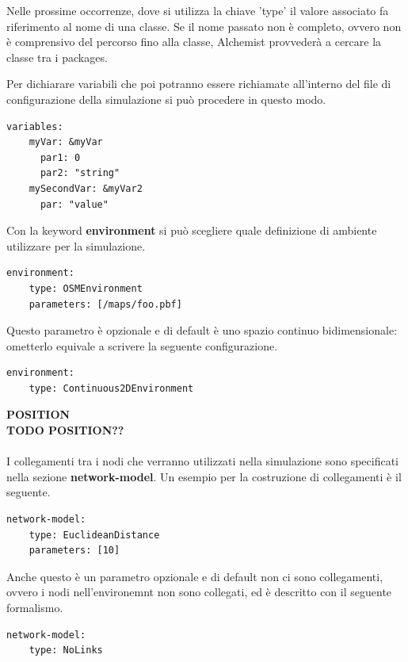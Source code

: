 \documentclass[12pt,a4paper,openright,twoside]{report}
\begin{document}
Nelle prossime occorrenze, dove si utilizza la chiave 'type' il valore associato fa riferimento al nome di una classe. Se il nome passato non \`e completo, ovvero non \`e comprensivo del percorso fino alla classe, Alchemist provveder\`a a cercare la classe tra i packages.

Per dichiarare variabili che poi potranno essere richiamate all'interno del file di configurazione della simulazione si pu\`o procedere in questo modo.
\medskip
\begin{lstlisting}[firstnumber=last,caption={Variabili simulazione}]
  variables:
    myVar: &myVar
      par1: 0
      par2: "string"
    mySecondVar: &myVar2
      par: "value"
\end{lstlisting}

Con la keyword \textbf{environment} si pu\`o scegliere quale definizione di ambiente utilizzare per la simulazione.
\medskip
\begin{lstlisting}[firstnumber=last,caption={Environment}]
  environment:
    type: OSMEnvironment
    parameters: [/maps/foo.pbf]
\end{lstlisting}
Questo parametro \`e opzionale e di default \`e uno spazio continuo bidimensionale: ometterlo equivale a scrivere la seguente configurazione.
\medskip
\begin{lstlisting}[firstnumber=last,caption={Default environment}]
  environment:
    type: Continuous2DEnvironment
\end{lstlisting}


\textbf{POSITION}
\\
\textbf{TODO POSITION??}
\\
\\
I collegamenti tra i nodi che verranno utilizzati nella simulazione sono specificati nella sezione \textbf{network-model}. Un esempio per la costruzione di collegamenti \`e il seguente.
\medskip
\begin{lstlisting}[firstnumber=last,caption={Funzione linking-rule}]
  network-model:
    type: EuclideanDistance
    parameters: [10]
\end{lstlisting}
Anche questo \`e un parametro opzionale e di default non ci sono collegamenti, ovvero i nodi nell'environemnt non sono collegati, ed \`e descritto con il seguente formalismo.
\medskip
\begin{lstlisting}[firstnumber=last,caption={Default linking-rule}]
  network-model:
    type: NoLinks
\end{lstlisting}
\end{document}
